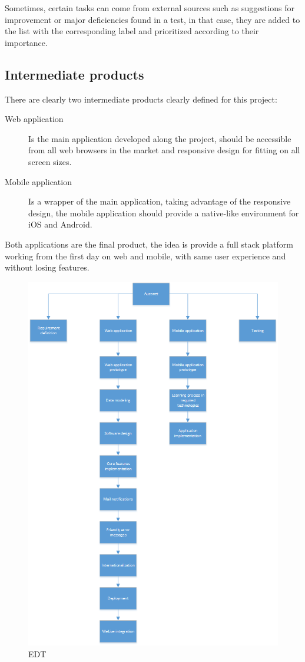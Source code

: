 \documentclass{DeustoFDP}
\begin{document}
Sometimes, certain tasks can come from external sources such as suggestions for improvement or major deficiencies found in a test, in that case, they are added to the list with the corresponding label and prioritized according to their importance.
\subsection{Intermediate products}
There are clearly two intermediate products clearly defined for this project:

\begin{description}
	\item[Web application] Is the main application developed along the project, should be accessible from all web browsers in the market and responsive design for fitting on all screen sizes. 
	\item[Mobile application] Is a wrapper of the main application, taking advantage of the responsive design, the mobile application should provide a native-like environment for iOS and Android.
\end{description}

Both applications are the final product, the idea is provide a full stack platform working from the first day on web and mobile, with same user experience and without losing features. 
\newpage

\begin{figure}[H]
	\centering
	\includegraphics{fig/EDT}
	\caption{EDT}\label{fig:edt}
\end{figure}
\end{document}
